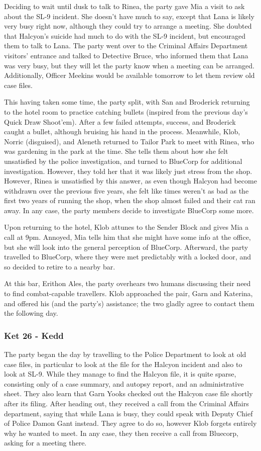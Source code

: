 Deciding to wait until dusk to talk to Rinea, the party gave Mia a visit to ask about the SL-9 incident. She doesn't have much to say, except that Lana is likely very busy right now, although they could try to arrange a meeting. She doubted that Halcyon's suicide had much to do with the SL-9 incident, but encouraged them to talk to Lana. The party went over to the Criminal Affairs Department visitors' entrance and talked to Detective Bruce, who informed them that Lana was very busy, but they will let the party know when a meeting can be arranged. Additionally, Officer Meekins would be available tomorrow to let them review old case files.

This having taken some time, the party split, with San and Broderick returning to the hotel room to practice catching bullets (inspired from the previous day's Quick Draw Shoot'em). After a few failed attempts, success, and Broderick caught a bullet, although bruising his hand in the process. Meanwhile, Klob, Norric (disguised), and Aleneth returned to Tailor Park to meet with Rinea, who was gardening in the park at the time. She tells them about how she felt unsatisfied by the police investigation, and turned to BlueCorp for additional investigation. However, they told her that it was likely just stress from the shop. However, Rinea is unsatisfied by this answer, as even though Halcyon had become withdrawn over the previous five years, she felt like times weren't as bad as the first two years of running the shop, when the shop almost failed and their cat ran away. In any case, the party members decide to investigate BlueCorp some more. 

Upon returning to the hotel, Klob attunes to the Sender Block and gives Mia a call at 9pm. Annoyed, Mia tells him that she might have some info at the office, but she will look into the general perception of BlueCorp. Afterward, the party travelled to BlueCorp, where they were met predictably with a locked door, and so decided to retire to a nearby bar.

At this bar, Erithon Ales, the party overhears two humans discussing their need to find combat-capable travellers. Klob approached the pair, Garn and Katerina, and offered his (and the party's) assistance; the two gladly agree to contact them the following day.

\subsubsection{Ket 26 - Kedd}
The party began the day by travelling to the Police Department to look at old case files, in particular to look at the file for the Halcyon incident and also to look at SL-9. While they manage to find the Halcyon file, it is quite sparse, consisting only of a case summary, and autopsy report, and an administrative sheet. They also learn that Garn Yooks checked out the Halcyon case file shortly after its filing. After heading out, they received a call from the Criminal Affairs department, saying that while Lana is busy, they could speak with Deputy Chief of Police Damon Gant instead. They agree to do so, however Klob forgets entirely why he wanted to meet. In any case, they then receive a call from Bluecorp, asking for a meeting there.

